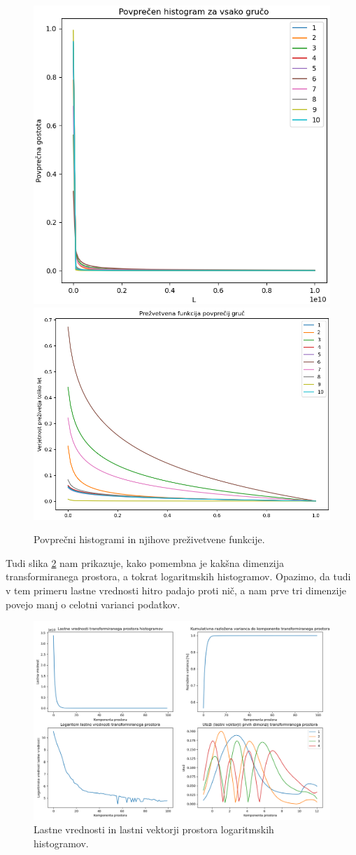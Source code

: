 \documentclass[a4paper]{IEEEtran}
\begin{document}
\begin{figure}
	\centering
	\includegraphics[width=0.49\linewidth]{Figures/lin10mean} \includegraphics[width=0.49\linewidth]{Figures/lin10surv}
	\caption{Povprečni histogrami in njihove preživetvene funkcije.}
	\label{fig:lin10clust}
\end{figure}

Tudi slika \ref{fig:logeig} nam prikazuje, kako pomembna je kakšna dimenzija transformiranega prostora, a tokrat logaritmskih histogramov. Opazimo, da tudi v tem primeru lastne vrednosti hitro padajo proti nič, a nam prve tri dimenzije povejo manj o celotni varianci podatkov.

\begin{figure}
	\centering
	\includegraphics[width=0.9\linewidth]{Figures/log_eigendecomp}
	\caption{Lastne vrednosti in lastni vektorji prostora logaritmskih histogramov.}
	\label{fig:logeig}
\end{figure}
\end{document}
